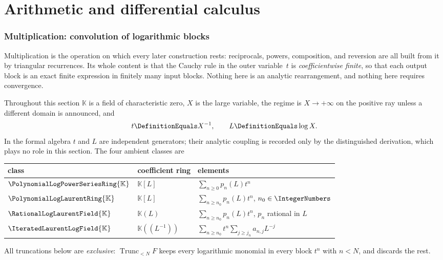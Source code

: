 \documentclass[11pt,oneside]{article}
\theoremstyle{plain}
\theoremstyle{definition}
\theoremstyle{remark}
\newcommand{\K}{\mathbb{K}}
\newcommand{\PLpow}{\PolynomialLogPowerSeriesRing{\K}}   %
\newcommand{\PLlau}{\PolynomialLogLaurentRing{\K}}       %
\newcommand{\PLrat}{\RationalLogLaurentField{\K}}        %
\newcommand{\PLit}{\IteratedLaurentLogField{\K}}         %
\newcommand{\Trunc}[2]{\operatorname{Trunc}_{<#2}#1}     %
\begin{document}
\clearpage
\part{Arithmetic and differential calculus}

\section{Multiplication: convolution of logarithmic blocks}
\label{plt:sec:multiplication}

Multiplication is the operation on which every later construction rests:
reciprocals, powers, composition, and reversion are all built from it by
triangular recurrences.  Its whole content is that the Cauchy rule in the
outer variable~$t$ is \emph{coefficientwise finite}, so that each output
block is an exact finite expression in finitely many input blocks.  Nothing
here is an analytic rearrangement, and nothing here requires convergence.

Throughout this section $\K$ is a field of characteristic zero, $X$ is the
large variable, the regime is $X\to+\infty$ on the positive ray unless a
different domain is announced, and
\begin{equation}\label{plt:eq:mul-generators}
 t\DefinitionEquals X^{-1},
 \qquad
 L\DefinitionEquals\log X .
\end{equation}
In the formal algebra $t$ and $L$ are independent generators; their analytic
coupling is recorded only by the distinguished derivation, which plays no
role in this section.  The four ambient classes are

\begin{center}
\begin{tabular}{@{}lll@{}}
\hline
class & coefficient ring & elements \\
\hline
$\PLpow$ & $\K[L]$ & $\sum_{n\ge0}p_n(L)t^n$ \\
$\PLlau$ & $\K[L]$ & $\sum_{n\ge n_0}p_n(L)t^n$, $n_0\in\IntegerNumbers$ \\
$\PLrat$ & $\K(L)$ & $\sum_{n\ge n_0}p_n(L)t^n$, $p_n$ rational in $L$ \\
$\PLit$  & $\K((L^{-1}))$ & $\sum_{n\ge n_0}t^n\sum_{j\ge j_n}a_{n,j}L^{-j}$ \\
\hline
\end{tabular}
\end{center}

All truncations below are \emph{exclusive}: $\Trunc{F}{N}$ keeps every
logarithmic monomial in every block $t^n$ with $n<N$, and discards the rest.
\end{document}
